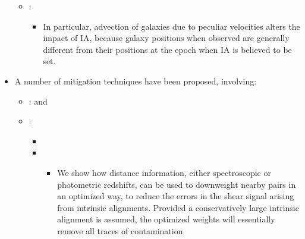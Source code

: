 \documentclass[letterpaper,10pt,english]{sphinxmanual}
\begin{document}
\begin{itemize}
\begin{itemize}
\begin{itemize}
\end{itemize}

\item {} 
: 
\begin{itemize}
\item {} 
In particular, advection of galaxies due to peculiar velocities
alters the impact of IA, because galaxy positions when observed
are generally different from their positions at the epoch when
IA is believed to be set.

\end{itemize}

\end{itemize}

\item {} 
A number of mitigation techniques have been proposed, involving:
\begin{itemize}
\item {} 
: 
and 

\item {} 
:
\begin{itemize}
\item {} 

\item {} 
\begin{itemize}
\item {} 
We show how distance information, either spectroscopic or
photometric redshifts, can be used to downweight nearby
pairs in an optimized way, to reduce the errors in the shear
signal arising from intrinsic alignments. Provided a
conservatively large intrinsic alignment is assumed, the
optimized weights will essentially remove all traces of
contamination

\end{itemize}


\end{itemize}
\end{itemize}
\end{itemize}
\end{document}
